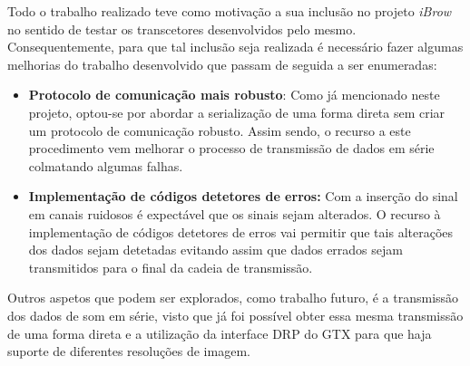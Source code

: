 Todo o trabalho realizado teve como motivação a sua inclusão no projeto \textit{iBrow} no sentido de testar os transcetores desenvolvidos pelo mesmo. Consequentemente, para que tal inclusão seja realizada é necessário fazer algumas melhorias do trabalho desenvolvido que passam de seguida a ser enumeradas:
\begin{itemize}
	\item \textbf{Protocolo de comunicação mais robusto}: Como já mencionado neste projeto, optou-se por abordar a serialização de uma forma direta sem criar um protocolo de comunicação robusto. Assim sendo, o recurso a este procedimento vem melhorar o processo de transmissão de dados em série colmatando algumas falhas.
	
	\item \textbf{Implementação de códigos detetores de erros:} Com a inserção do sinal em canais ruidosos é expectável que os sinais sejam alterados. O recurso à implementação de códigos detetores de erros vai permitir que tais alterações dos dados sejam detetadas evitando assim que dados errados sejam transmitidos para o final da cadeia de transmissão.
\end{itemize}

Outros aspetos que podem ser explorados, como trabalho futuro, é a transmissão dos dados de som em série, visto que já foi possível obter essa mesma transmissão de uma forma direta e a utilização da interface DRP do GTX para que haja suporte de diferentes resoluções de imagem.

%
%
%

